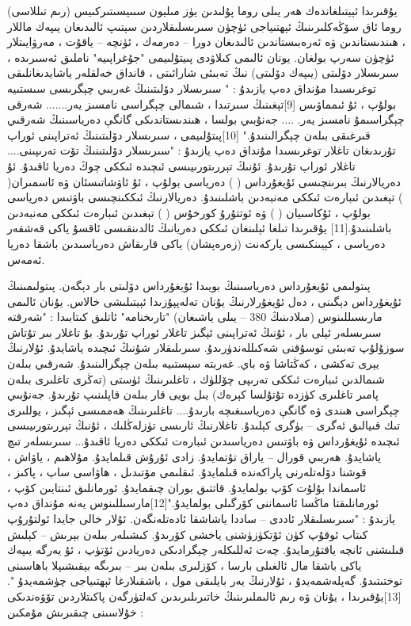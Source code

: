 \documentclass[a4paper]{article}
\begin{document}
\begin{flushright}
يۇقىرىدا ئېيتىلغاندەك ھەر يىلى روما پۇلىدىن يۈز مىليون سىىيسىتىركىيس (رىم تىللاسى) روما ئاق سۆڭەكلىرىنىڭ ئېھتىياجى ئۈچۈن سىرىسلىقلاردىن سېتىپ ئالىدىغان يىپەك ماللار ، ھىندىستاندىن ۋە ئەرەبىستاندىن ئالىدىغان دورا – دەرمەك ، ئۈنچە – ياقۇت ، مەرۋايىتلار ئۈچۈن سەرپ بولغان. يونان ئالىمى كىلاۋدى پىيتۇلىيمى "جۇغراپىيە" ناملىق ئەسىرىدە ، سىرىسلار دۆلىتى (يىپەك دۆلىتى) نىڭ تەبىئى شارائىتى ، قانداق خەلقلەر ياشايدىغانلىقى توغرىسىدا مۇنداق دەپ يازىدۇ : " سىرىسلار دۆلىتىنىڭ غەربىي چېگرىسى سىستىيە بولۇپ ، ئۇ ئىمماۋىس [9]تېغىنىڭ سىرتىدا ، شىمالى چېگراسى نامسىز يەر....... شەرقى چېگراسىمۇ نامسىز يەر. .... جەنۇبىي بولسا ، ھىندىستاندىكى گانگې دەرياسىنىڭ شەرقىي قىرغىقى بىلەن چېگرالىنىدۇ." [10]پىتۇلىيمى ، سىرىسلار دۆلىتىنىڭ ئەتراپىنى ئوراپ تۇرىدىغان تاغلار توغرىسىدا مۇنداق دەپ يازىدۇ : "سىرىسلار دۆلىتىنىڭ تۆت تەرىپىنى.... تاغلار ئوراپ تۇرىدۇ. ئۇنىڭ تېررىتورىيىسى ئىچىدە ئىككى چوڭ دەريا ئاقىدۇ. ئۇ دەريالارنىڭ بىرىنچىسى ئۇيغۇرداس ( ) دەرياسى بولۇپ ، ئۇ ئاۋشاتىسئان ۋە ئاسمىران( ) تېغىدىن ئىبارەت ئىككى مەنبەدىن باشلىنىدۇ. دەريالارنىڭ ئىككىنچىسى باۋتىس دەرياسى بولۇپ ، ئۇكاسىيان ( ) ۋە ئوتتۇرۇ كورخۇس ( ) تېغىدىن ئىبارەت ئىككى مەنبەدىن باشلىنىدۇ.[11] يۇقىرىدا تىلغا ئېلىنغان ئىككى دەريانىڭ ئالدىنقىسى ئاقسۇ ياكى قەشقەر دەرياسى ، كېيىنكىسى ياركەنت (زەرەپشان) ياكى قارىقاش دەرياسىدىن باشقا دەريا ئەمەس.



پىتولىمى ئۇيغۇرداس دەرياسىنىڭ بويىدا ئۇيغۇرداس دۆلىتى بار دېگەن. پىتولىمىنىڭ ئۇيغۇرداس دېگىنى ، دەل ئۇيغۇرلارنىڭ يۇنان تەلەپپۇزىدا ئېيتىلىشى خالاس. يۇنان ئالىمى مارىسىللىنوس (مىلادىنىڭ 380 – يىلى ياشىغان) "تارىخنامە" ئاتلىق كىتابىدا : "شەرقتە سىرىسلەر ئېلى بار ، ئۇنىڭ ئەتراپىنى ئېگىز تاغلار ئوراپ تۇرىدۇ. بۇ تاغلار بىر تۇتاش سوزۇلۇپ تەبىئى توسۇقنى شەكىللەندۈرىدۇ. سىرىلىقلار شۇنىڭ ئىچىدە ياشايدۇ. ئۇلارنىڭ يېرى تەكشى ، كەڭتاشا ۋە باي. غەربتە سېستىيە بىلەن چېگرالىنىدۇ. شەرقىي بىلەن شىمالدىن ئىبارەت ئىككى تەرىپى چۆللۈك ، تاغلىرىنىڭ ئۈستى (تەڭرى تاغلىرى بىلەن پامىر تاغلىرى كۈزدە تۇتۇلسا كېرەك) يىل بويى قار بىلەن قاپلىنىپ تۇرىدۇ. جەنۇبىي چېگراسى ھىندى ۋە گانگې دەرياسىغىچە بارىدۇ.... تاغلىرىنىڭ ھەممىسى ئېگىز ، يوللىرى تىك قىيالىق ئەگرى – بۈگرى كېلىدۇ. تاغلارنىڭ ئارىسى تۈزلەڭلىك ، ئۇنىڭ تېررىتورىيىسى ئىچىدە ئۇيغۇرداس ۋە باۋتىس دەرياسىدىن ئىبارەت ئىككى دەريا ئاقىدۇ... سىرىسلەر تىچ ياشايدۇ. ھەربىي قورال – ياراق تۇتمايدۇ. زادى ئۇرۇش قىلمايدۇ. مۇلاھىم ، ياۋاش ، قوشنا دۆلەتلەرنى پاراكەندە قىلمايدۇ. ئىقلىمى مۆتىدىل ، ھاۋاسى ساپ ، پاكىز ، ئاسماندا بۇلۇت كۆپ بولمايدۇ. قاتتىق بوران چىقمايدۇ. ئورمانلىق ئىنتايىن كۆپ ، ئورمانلىقتا ماڭسا ئاسماننى كۆرگىلى بولمايدۇ."[12]مارسىللىنوس يەنە مۇنداق دەپ يازىدۇ : "سىرىسلىقلار ئاددى – ساددا ياشاشقا ئادەتلەنگەن. ئۇلار خالى جايدا ئولتۇرۇپ كىتاب ئوقۇپ كۈن ئۆتكۈزۈشنى ياخشى كۆرىدۇ. كىشىلەر بىلەن بېرىش – كېلىش قىلىشنى ئانچە ياقتۇرمايدۇ. چەت ئەللىكلەر چېگرادىكى دەريادىن ئۆتۈپ ، ئۇ يەرگە يىپەك ياكى باشقا مال ئالغىلى بارسا ، كۆزلىرى بىلەن بىر – بىرىگە بېقىشىپلا باھاسىنى توختىتىدۇ. گەپلەشمەيدۇ ، ئۇلارنىڭ يەر بايلىقى مول ، باشقىلارغا ئېھتىياجى چۈشمەيدۇ ".[13]يۇقىرىدا ، يۇنان ۋە رىم ئالىملىرىنىڭ خاتىرىلىرىدىن كەلتۈرگەن پاكىتلاردىن تۆۋەندىكى خۇلاسىنى چىقىرىش مۇمكىن :








\end{flushright}
\end{document}
